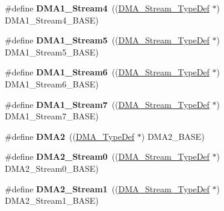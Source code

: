 \begin{DoxyCompactItemize}
\item 
\hypertarget{group___peripheral__declaration_ga87df45f4b82e0b3a8c1b17f1a77aecdb}{\#define {\bfseries D\-M\-A1\-\_\-\-Stream4}~((\hyperlink{struct_d_m_a___stream___type_def}{D\-M\-A\-\_\-\-Stream\-\_\-\-Type\-Def} $\ast$) D\-M\-A1\-\_\-\-Stream4\-\_\-\-B\-A\-S\-E)}\label{group___peripheral__declaration_ga87df45f4b82e0b3a8c1b17f1a77aecdb}

\item 
\hypertarget{group___peripheral__declaration_gac3abc20f80e25c19b02104ad34eae652}{\#define {\bfseries D\-M\-A1\-\_\-\-Stream5}~((\hyperlink{struct_d_m_a___stream___type_def}{D\-M\-A\-\_\-\-Stream\-\_\-\-Type\-Def} $\ast$) D\-M\-A1\-\_\-\-Stream5\-\_\-\-B\-A\-S\-E)}\label{group___peripheral__declaration_gac3abc20f80e25c19b02104ad34eae652}

\item 
\hypertarget{group___peripheral__declaration_gac95127480470900755953f1cfe68567d}{\#define {\bfseries D\-M\-A1\-\_\-\-Stream6}~((\hyperlink{struct_d_m_a___stream___type_def}{D\-M\-A\-\_\-\-Stream\-\_\-\-Type\-Def} $\ast$) D\-M\-A1\-\_\-\-Stream6\-\_\-\-B\-A\-S\-E)}\label{group___peripheral__declaration_gac95127480470900755953f1cfe68567d}

\item 
\hypertarget{group___peripheral__declaration_ga8ecdeaf43d0f4207dab1fdb4d7bf8d26}{\#define {\bfseries D\-M\-A1\-\_\-\-Stream7}~((\hyperlink{struct_d_m_a___stream___type_def}{D\-M\-A\-\_\-\-Stream\-\_\-\-Type\-Def} $\ast$) D\-M\-A1\-\_\-\-Stream7\-\_\-\-B\-A\-S\-E)}\label{group___peripheral__declaration_ga8ecdeaf43d0f4207dab1fdb4d7bf8d26}

\item 
\hypertarget{group___peripheral__declaration_ga506520140eec1708bc7570c49bdf972d}{\#define {\bfseries D\-M\-A2}~((\hyperlink{struct_d_m_a___type_def}{D\-M\-A\-\_\-\-Type\-Def} $\ast$) D\-M\-A2\-\_\-\-B\-A\-S\-E)}\label{group___peripheral__declaration_ga506520140eec1708bc7570c49bdf972d}

\item 
\hypertarget{group___peripheral__declaration_ga3a2efe5fd7a7a79be3b08a1670bbd016}{\#define {\bfseries D\-M\-A2\-\_\-\-Stream0}~((\hyperlink{struct_d_m_a___stream___type_def}{D\-M\-A\-\_\-\-Stream\-\_\-\-Type\-Def} $\ast$) D\-M\-A2\-\_\-\-Stream0\-\_\-\-B\-A\-S\-E)}\label{group___peripheral__declaration_ga3a2efe5fd7a7a79be3b08a1670bbd016}

\item 
\hypertarget{group___peripheral__declaration_gae96f15d34d3c41c16fce69bc2878151a}{\#define {\bfseries D\-M\-A2\-\_\-\-Stream1}~((\hyperlink{struct_d_m_a___stream___type_def}{D\-M\-A\-\_\-\-Stream\-\_\-\-Type\-Def} $\ast$) D\-M\-A2\-\_\-\-Stream1\-\_\-\-B\-A\-S\-E)}\label{group___peripheral__declaration_gae96f15d34d3c41c16fce69bc2878151a}


\end{DoxyCompactItemize}

